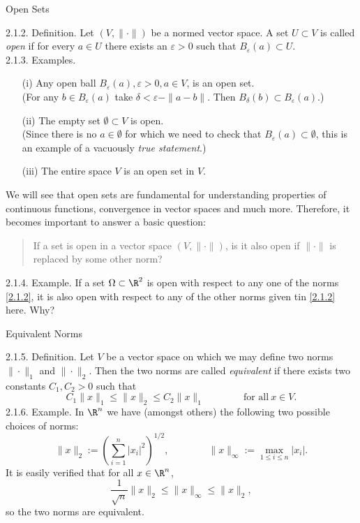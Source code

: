 \documentclass[smaller,hyperref={CJKbookmarks=true}]{beamer}
\begin{document}
\begin{frame}{Open Sets}
\begin{spacing}{1.05}
\alert{2.1.2. Definition.} Let $(V,\|\cdot\|)$ be a normed vector space. A set $U\subset V$ is called \emph{open} if for every $a\in U$ there exists an $\varepsilon>0$ such that $B_{\varepsilon}(a)\subset U$.\\[6pt]
\alert{2.1.3. Examples.}
\begin{itemize}
  \item[(i)] Any open ball $B_{\varepsilon}(a),\varepsilon>0,a\in V$, is an open set.\\ (For any $b\in B_{\varepsilon}(a)$ take $\delta<\varepsilon-\|a-b\|$. Then $B_{\delta}(b)\subset B_{\varepsilon}(a)$.)
  \item[(ii)] The empty set $\emptyset\subset V$ is open.\\
      (Since there is no $a\in\emptyset$ for which we need to check that $B_{\varepsilon}(a)\subset\emptyset$, this is an example of a vacuously \emph{true statement}.)
  \item[(iii)] The entire space $V$ is an open set in $V$.
\end{itemize}
\newpage
We will see that open sets are fundamental for understanding properties of
continuous functions, convergence in vector spaces and much more.
Therefore, it becomes important to answer a basic question:
\begin{quote}
  If a set is open in a vector space $(V,\|\cdot\|)$, is it also open if $\|\cdot\|$ is replaced by some other norm?
\end{quote}
\alert{2.1.4. Example.} If a set $\Omega\subset\R^2$ is open with respect to any one of the norms \eqref{2.1.2}, it is also open with respect to any of the other norms given tin \eqref{2.1.2} here. Why?
\end{spacing}
\end{frame}
\begin{frame}[t]{Equivalent Norms}
\begin{spacing}{0.95}
\alert{2.1.5. Definition.} Let $V$ be a vector space on which we may define two norms $\|\cdot\|_1$ and $\|\cdot\|_2$. Then the two norms are called \emph{equivalent} if there exists two constants $C_1,C_2>0$ such that
\begin{equation}\label{2.1.3}
  C_1\|x\|_1\leq\|x\|_2\leq C_2\|x\|_1\qquad\qquad\text{for all}~x\in V.
\end{equation}
\alert{2.1.6. Example.} In $\R^n$ we have (amongst others) the following two possible choices of norms:
\begin{equation}\label{2.1.4}
  \|x\|_2:=\left(\sum_{i=1}^{n}|x_i|^2\right)^{1/2},\qquad\qquad
  \|x\|_{\infty}:=\max\limits_{1\leq i\leq n}|x_i|.
\end{equation}
It is easily verified that for all $x\in\R^n$,
\[\frac{1}{\sqrt{n}}\|x\|_2\leq\|x\|_{\infty}\leq\|x\|_2,\]
so the two norms are equivalent.
\end{spacing}
\end{frame}
\end{document}
